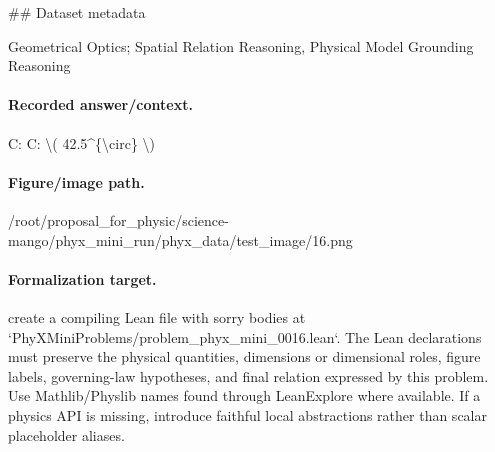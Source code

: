 \#\# Dataset metadata

Geometrical Optics; Spatial Relation Reasoning, Physical Model Grounding Reasoning

\paragraph{Recorded answer/context.}
C: C: \textbackslash{}( 42.5\textasciicircum{}\{\textbackslash{}circ\} \textbackslash{})

\paragraph{Figure/image path.}
/root/proposal\_for\_physic/science-mango/phyx\_mini\_run/phyx\_data/test\_image/16.png

\paragraph{Formalization target.}
create a compiling Lean file with sorry bodies at `PhyXMiniProblems/problem\_phyx\_mini\_0016.lean`. The Lean declarations must preserve the physical quantities, dimensions or dimensional roles, figure labels, governing-law hypotheses, and final relation expressed by this problem.
Use Mathlib/Physlib names found through LeanExplore where available. If a physics API is missing, introduce faithful local abstractions rather than scalar placeholder aliases.

